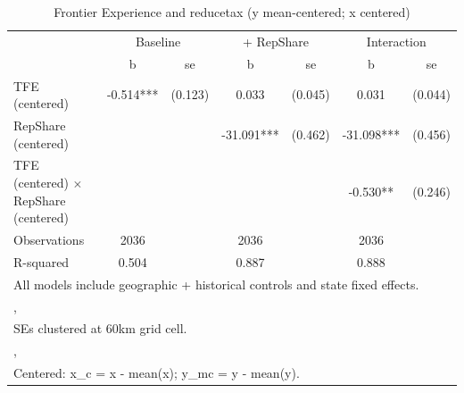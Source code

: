 \begin{table}[htbp]\centering
\def\sym#1{\ifmmode^{#1}\else\(^{#1}\)\fi}
\caption{Frontier Experience and reducetax (y mean-centered; x centered)}
\begin{tabular}{l*{3}{cc}}
\toprule
                &\multicolumn{2}{c}{Baseline}&\multicolumn{2}{c}{ + RepShare}&\multicolumn{2}{c}{Interaction}\\
                &        b   &       se&        b   &       se&        b   &       se\\
\midrule
TFE (centered)  &   -0.514***&  (0.123)&    0.033   &  (0.045)&    0.031   &  (0.044)\\
RepShare (centered)&            &         &  -31.091***&  (0.462)&  -31.098***&  (0.456)\\
TFE (centered) $\times$ RepShare (centered)&            &         &            &         &   -0.530** &  (0.246)\\
\midrule
Observations    &     2036   &         &     2036   &         &     2036   &         \\
R-squared       &    0.504   &         &    0.887   &         &    0.888   &         \\
\bottomrule
\multicolumn{7}{l}{\footnotesize All models include geographic + historical controls and state fixed effects.}\\
\multicolumn{7}{l}{\footnotesize ,}\\
\multicolumn{7}{l}{\footnotesize SEs clustered at 60km grid cell.}\\
\multicolumn{7}{l}{\footnotesize ,}\\
\multicolumn{7}{l}{\footnotesize Centered: x\_c = x - mean(x); y\_mc = y - mean(y).}\\
\end{tabular}
\end{table}
